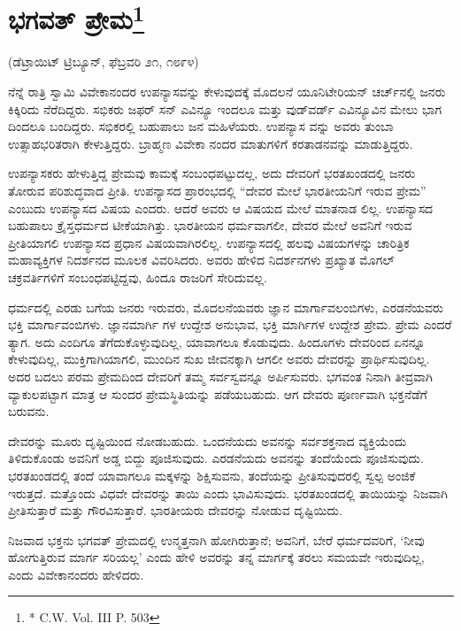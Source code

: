 \delimiter


\section[ಭಗವತ್ ಪ್ರೇಮ]{ಭಗವತ್ ಪ್ರೇಮ\protect\footnote{* C.W. Vol. III P. 503}}

\begin{center}
(ಡೆಟ್ರಾಯಿಟ್​ ಟ್ರಿಬ್ಯೂನ್​, ಫೆಬ್ರವರಿ ೨೧, ೧೮೯೪)
\end{center}

ನೆನ್ನೆ ರಾತ್ರಿ ಸ್ವಾಮಿ ವಿವೇಕಾನಂದರ ಉಪನ್ಯಾಸವನ್ನು ಕೇಳುವುದಕ್ಕೆ ಮೊದಲನೆ ಯೂನಿಟೇರಿಯನ್​ ಚರ್ಚ್​ನಲ್ಲಿ ಜನರು ಕಿಕ್ಕಿರಿದು ನೆರೆದಿದ್ದರು. ಸಭಿಕರು ಜಫರ್​ ಸನ್​ ಎವಿನ್ಯೂ ಇಂದಲೂ ಮತ್ತು ವುಡ್​ವರ್ಡ್​ ಎವಿನ್ಯೂವಿನ ಮೇಲು ಭಾಗ ದಿಂದಲೂ ಬಂದಿದ್ದರು. ಸಭಿಕರಲ್ಲಿ ಬಹುಪಾಲು ಜನ ಮಹಿಳೆಯರು. ಉಪನ್ಯಾಸ ವನ್ನು ಅವರು ತುಂಬಾ ಉತ್ಸಾಹಭರಿತರಾಗಿ ಕೇಳುತ್ತಿದ್ದರು. ಬ್ರಾಹ್ಮಣ ವಿವೇಕಾ ನಂದರ ಮಾತುಗಳಿಗೆ ಕರತಾಡನವನ್ನು ಮಾಡುತ್ತಿದ್ದರು.

ಉಪನ್ಯಾಸಕರು ಹೇಳುತ್ತಿದ್ದ ಪ್ರೇಮವು ಕಾಮಕ್ಕೆ ಸಂಬಂಧಪಟ್ಟುದಲ್ಲ, ಅದು ದೇವರಿಗೆ ಭರತಖಂಡದಲ್ಲಿ ಜನರು ತೋರುವ ಪರಿಶುದ್ಧವಾದ ಪ್ರೀತಿ. ಉಪನ್ಯಾಸದ ಪ್ರಾರಂಭದಲ್ಲಿ “ದೇವರ ಮೇಲೆ ಭಾರತೀಯನಿಗೆ ಇರುವ ಪ್ರೇಮ” ಎಂಬುದು ಉಪನ್ಯಾಸದ ವಿಷಯ ಎಂದರು. ಆದರೆ ಅವರು ಆ ವಿಷಯದ ಮೇಲೆ ಮಾತನಾಡ ಲಿಲ್ಲ. ಉಪನ್ಯಾಸದ ಬಹುಪಾಲು ಕ್ರೈಸ್ತಧರ್ಮದ ಟೀಕೆಯಾಗಿತ್ತು. ಭಾರತೀಯನ ಧರ್ಮವಾಗಲೀ, ದೇವರ ಮೇಲೆ ಅವನಿಗೆ ಇರುವ ಪ್ರೀತಿಯಾಗಲಿ ಉಪನ್ಯಾಸದ ಪ್ರಧಾನ ವಿಷಯವಾಗಿರಲಿಲ್ಲ. ಉಪನ್ಯಾಸದಲ್ಲಿ ಹಲವು ವಿಷಯಗಳನ್ನು ಚಾರಿತ್ರಿಕ ಮಹಾವ್ಯಕ್ತಿಗಳ ನಿದರ್ಶನದ ಮೂಲಕ ವಿವರಿಸಿದರು. ಅವರು ಹೇಳಿದ ನಿದರ್ಶನಗಳು ಪ್ರಖ್ಯಾತ ಮೊಗಲ್​ ಚಕ್ರವರ್ತಿಗಳಿಗೆ ಸಂಬಂಧಪಟ್ಟಿದ್ದವು, ಹಿಂದೂ ರಾಜರಿಗೆ ಸೇರಿದುವಲ್ಲ.

ಧರ್ಮದಲ್ಲಿ ಎರಡು ಬಗೆಯ ಜನರು ಇರುವರು, ಮೊದಲನೆಯವರು ಜ್ಞಾನ ಮಾರ್ಗಾವಲಂಬಿಗಳು, ಎರಡನೆಯವರು ಭಕ್ತಿ ಮಾರ್ಗಾವಂಬಿಗಳು. ಜ್ಞಾನಮಾರ್ಗಿ ಗಳ ಉದ್ದೇಶ ಅನುಭಾವ, ಭಕ್ತಿ ಮಾರ್ಗಿಗಳ ಉದ್ದೇಶ ಪ್ರೇಮ. ಪ್ರೇಮ ಎಂದರೆ ತ್ಯಾಗ. ಅದು ಎಂದಿಗೂ ತೆಗೆದುಕೊಳ್ಳುವುದಿಲ್ಲ, ಯಾವಾಗಲೂ ಕೊಡುವುದು. ಹಿಂದೂಗಳು ದೇವರಿಂದ ಏನನ್ನೂ ಕೇಳುವುದಿಲ್ಲ, ಮುಕ್ತಿಗಾಗಿಯಾಗಲಿ, ಮುಂದಿನ ಸುಖ ಜೀವನಕ್ಕಾಗಿ ಆಗಲೀ ಅವರು ದೇವರನ್ನು ಪ್ರಾರ್ಥಿಸುವುದಿಲ್ಲ. ಅದರ ಬದಲು ಪರಮ ಪ್ರೇಮದಿಂದ ದೇವರಿಗೆ ತಮ್ಮ ಸರ್ವಸ್ವವನ್ನೂ ಅರ್ಪಿಸುವರು. ಭಗವಂತ ನಿನಾಗಿ ತೀವ್ರವಾಗಿ ವ್ಯಾಕುಲಪಟ್ಟಾಗ ಮಾತ್ರ ಆ ಸುಂದರ ಪ್ರೇಮಸ್ಥಿತಿಯನ್ನು ಪಡೆಯಬಹುದು. ಆಗ ದೇವರು ಪೂರ್ಣವಾಗಿ ಭಕ್ತನೆಡೆಗೆ ಬರುವನು.

ದೇವರನ್ನು ಮೂರು ದೃಷ್ಟಿಯಿಂದ ನೋಡಬಹುದು. ಒಂದನೆಯದು ಅವನನ್ನು ಸರ್ವಶಕ್ತನಾದ ವ್ಯಕ್ತಿಯೆಂದು ತಿಳಿದುಕೊಂಡು ಅವನಿಗೆ ಅಡ್ಡ ಬಿದ್ದು ಪೂಜಿಸುವುದು. ಎರಡನೆಯದು ಅವನನ್ನು ತಂದೆಯೆಂದು ಪೂಜಿಸುವುದು. ಭರತಖಂಡದಲ್ಲಿ ತಂದೆ ಯಾವಾಗಲೂ ಮಕ್ಕಳನ್ನು ಶಿಕ್ಷಿಸುವನು, ತಂದೆಯನ್ನು ಪ್ರೀತಿಸುವುದರಲ್ಲಿ ಸ್ವಲ್ಪ ಅಂಜಿಕೆ ಇರುತ್ತದೆ. ಮತ್ತೊಂದು ವಿಧವೇ ದೇವರನ್ನು ತಾಯಿ ಎಂದು ಭಾವಿಸುವುದು. ಭರತಖಂಡದಲ್ಲಿ ತಾಯಿಯನ್ನು ನಿಜವಾಗಿ ಪ್ರೀತಿಸುತ್ತಾರೆ ಮತ್ತು ಗೌರವಿಸುತ್ತಾರೆ. ಭಾರತೀಯರು ದೇವರನ್ನು ನೋಡುವ ದೃಷ್ಟಿಯಿದು.

ನಿಜವಾದ ಭಕ್ತನು ಭಗವತ್​ ಪ್ರೇಮದಲ್ಲಿ ಉನ್ಮತ್ತನಾಗಿ ಹೋಗಿರುತ್ತಾನೆ; ಅವನಿಗೆ, ಬೇರೆ ಧರ್ಮದವರಿಗೆ, ‘ನೀವು ಹೋಗುತ್ತಿರುವ ಮಾರ್ಗ ಸರಿಯಲ್ಲ’ ಎಂದು ಹೇಳಿ ಅವರನ್ನು ತನ್ನ ಮಾರ್ಗಕ್ಕೆ ತರಲು ಸಮಯವೇ ಇರುವುದಿಲ್ಲ, ಎಂದು ವಿವೇಕಾನಂದರು ಹೇಳಿದರು.

